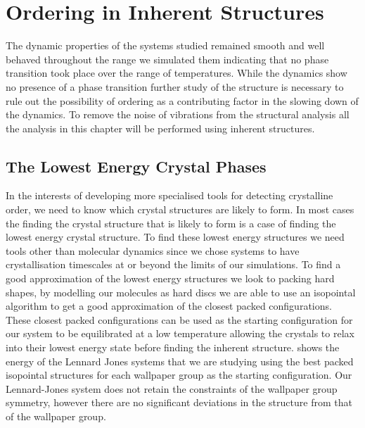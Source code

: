 \chapter{Ordering in Inherent Structures}

The dynamic properties of the systems studied remained smooth and well behaved throughout the range we simulated them indicating that no phase transition took place over the range of temperatures. While the dynamics show no presence of a phase transition further study of the structure is necessary to rule out the possibility of ordering as a contributing factor in the slowing down of the dynamics. To remove the noise of vibrations from the structural analysis all the analysis in this chapter will be performed using inherent structures.


\section{The Lowest Energy Crystal Phases}

In the interests of developing more specialised tools for detecting crystalline order, we need to know which crystal structures are likely to form. In most cases the finding the crystal structure that is likely to form is a case of finding the lowest energy crystal structure. To find these lowest energy structures we need tools other than molecular dynamics since we chose systems to have crystallisation timescales at or beyond the limits of our simulations. To find a good approximation of the lowest energy structures we look to packing hard shapes, by modelling our molecules as hard discs we are able to use an isopointal algorithm to get a good approximation of the closest packed configurations. These closest packed configurations can be used as the starting configuration for our system to be equilibrated at a low temperature allowing the crystals to relax into their lowest energy state before finding the inherent structure.  shows the energy of the Lennard Jones systems that we are studying using the best packed isopointal structures for each wallpaper group as the starting configuration. Our Lennard-Jones system does not retain the constraints of the wallpaper group symmetry, however there are no significant deviations in the structure from that of the wallpaper group.

